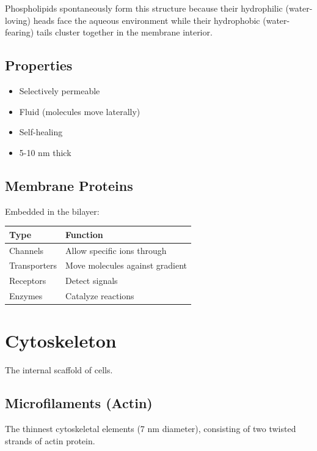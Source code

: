 \documentclass[
  11pt,
  letterpaper,
  twoside,
  openright]{book}
\providecommand{\tightlist}{%
  \setlength{\itemsep}{0pt}\setlength{\parskip}{0pt}}
\begin{document}
Phospholipids spontaneously form this structure because their
hydrophilic (water-loving) heads face the aqueous environment while
their hydrophobic (water-fearing) tails cluster together in the membrane
interior.

\subsection{Properties}\label{properties-10}

\begin{itemize}
\tightlist
\item
  Selectively permeable
\item
  Fluid (molecules move laterally)
\item
  Self-healing
\item
  5-10 nm thick
\end{itemize}

\subsection{Membrane Proteins}\label{membrane-proteins}

Embedded in the bilayer:

\begin{longtable}[]{@{}ll@{}}
\toprule\noalign{}
Type & Function \\
\midrule\noalign{}
\endhead
\bottomrule\noalign{}
\endlastfoot
Channels & Allow specific ions through \\
Transporters & Move molecules against gradient \\
Receptors & Detect signals \\
Enzymes & Catalyze reactions \\
\end{longtable}

\section{Cytoskeleton}\label{cytoskeleton}

The internal scaffold of cells.

\subsection{Microfilaments (Actin)}\label{microfilaments-actin}

The thinnest cytoskeletal elements (7 nm diameter), consisting of two
twisted strands of actin protein.
\end{document}
